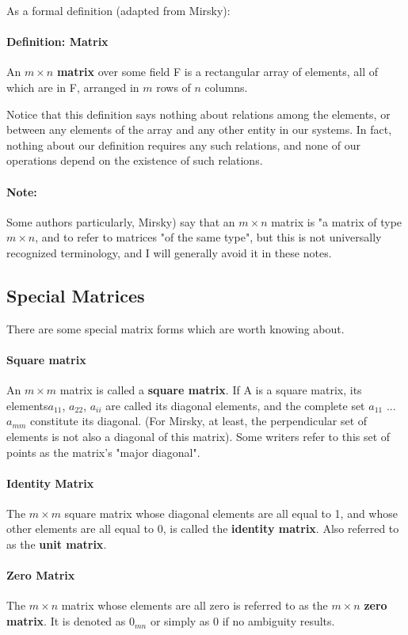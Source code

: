 \documentclass[12pt,letterpaper,final]{article}
\begin{document}
As a formal definition (adapted from Mirsky):

\paragraph{Definition: Matrix} An $m \times n$ \textbf{matrix} over some field F is a rectangular array of elements, all of which are in F, arranged in $m$ rows of $n$ columns. 

Notice that this definition says nothing about relations among the elements, or between any elements of the array and any other entity in our systems. In fact, nothing about our definition requires any such relations, and none of our operations depend on the existence of such relations. 

\paragraph{Note:} Some authors particularly, Mirsky) say that an $m \times n$ matrix is "a matrix of type $m \times n$, and to refer to matrices "of the same type", but this is not universally recognized terminology, and I will generally avoid it in these notes. 

\subsection{Special Matrices}
There are some special matrix forms which are worth knowing about. 
\paragraph{Square matrix} An $m \times m$ matrix is called a \textbf{square matrix}. If A is a square matrix, its elements$a_{11}$, $a_{22}$, $a_{ii}$ are called its diagonal elements, and the complete set $a_{11}$ ... $a_{mm}$ constitute its diagonal. (For Mirsky, at least, the perpendicular set of elements is not also a diagonal of this matrix). Some writers refer to this set of points as the matrix's "major diagonal". 

\paragraph{Identity Matrix} The $m \times m$ square matrix whose  diagonal elements are all equal to 1, and whose other elements are all equal to 0, is called the \textbf{identity matrix}. Also referred to as the \textbf{unit matrix}. 

\paragraph{Zero Matrix} The $m \times n$ matrix whose elements are all zero is referred to as the $m \times n$ \textbf{zero matrix}. It is denoted as $0_{mn}$ or simply as 0 if no ambiguity results. 
\end{document}
